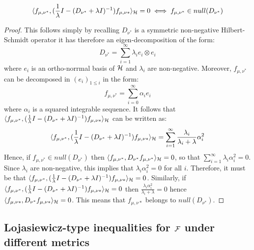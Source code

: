 \begin{proposition}\label{prop:null_space_diff_operator}
	 \[\langle f_{\mu,\nu^{*}}, (\frac{1}{\lambda}I - (D_{\nu^{*}} +\lambda I )^{-1})f_{\mu,\nu{*}} \rangle_{{{\mathcal H}}} = 0 \iff f_{\mu,\nu^{*}} \in null(D_{\nu^{*}})
	 \]
\end{proposition}
\begin{proof}
	This follows simply by recalling $D_{\nu^{*}}$ is a symmetric non-negative Hilbert-Schmidt operator it has therefore an eigen-decomposition of the form:
	\[
	D_{\nu^{*}}  = \sum_{i=1}^{\infty} \lambda_i e_i \otimes e_i
 	\]
 	where $e_i$ is an ortho-norrmal basis of ${{\mathcal H}}$ and $\lambda_i$ are non-negative. Moreover, $f_{\mu,\nu^{*}}$ can be decomposed in $(e_i)_{1\leq i}$ in the form:
 	\[
 	f_{\mu,\nu^{*}} = \sum_{i=0}^{\infty} \alpha_i e_i
 	\]
 	where $\alpha_i$ is a squared integrable sequence. It follows that $\langle f_{\mu,\nu^{*}}, (\frac{1}{\lambda}I - (D_{\nu^{*}} +\lambda I )^{-1})f_{\mu,\nu{*}} \rangle_{{{\mathcal H}}}$ can be written as:
 	\[
 	\langle f_{\mu,\nu^{*}}, (\frac{1}{\lambda}I - (D_{\nu^{*}} +\lambda I )^{-1})f_{\mu,\nu{*}} \rangle_{{{\mathcal H}}} = \sum_{i=1}^{\infty} \frac{\lambda_i}{\lambda_i+\lambda} \alpha_i^2
 	\]
 	Hence, if $f_{\mu,\nu^{*}}\in null(D_{\nu^{*}})$ then $\langle f_{\mu,\nu^{*}}, D_{\nu^{*}}f_{\mu,\nu^{*}}\rangle_{{{\mathcal H}}}= 0$, so that $\sum_{i=1}^{\infty} \lambda_i \alpha_i^2 = 0$. Since $\lambda_i$ are non-negative, this implies that $\lambda_i \alpha_i^2= 0$ for all $i$. Therefore, it must be that $\langle f_{\mu,\nu^{*}}, (\frac{1}{\lambda}I - (D_{\nu^{*}} +\lambda I )^{-1})f_{\mu,\nu{*}} \rangle_{{{\mathcal H}}}  = 0$.
 	Similarly, if $\langle f_{\mu,\nu^{*}}, (\frac{1}{\lambda}I - (D_{\nu^{*}} +\lambda I )^{-1})f_{\mu,\nu{*}} \rangle_{{{\mathcal H}}}  =0 $ then $\frac{\lambda_i\alpha_i^2}{\lambda_i + \lambda} = 0$ hence $\langle f_{\mu,\nu{*}}, D_{\nu^{*}} f_{\mu,\nu{*}} \rangle_{{{\mathcal H}}} = 0$. This means that $f_{\mu,\nu{*}}$ belongs to $null(D_{\nu^*})$.
\end{proof}


\subsection{Lojasiewicz-type inequalities for ${{\mathcal F}}$ under different metrics}\label{subsec:Lojasiewicz_different_metrics}

